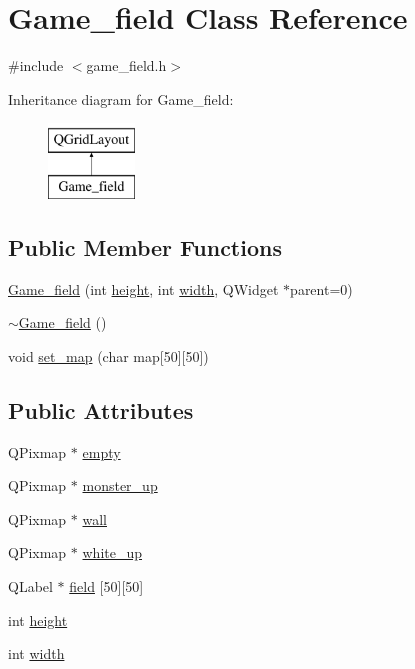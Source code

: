 \hypertarget{classGame__field}{\section{Game\-\_\-field Class Reference}
\label{classGame__field}
}


{\ttfamily \#include $<$game\-\_\-field.\-h$>$}

Inheritance diagram for Game\-\_\-field\-:\begin{figure}[H]
\begin{center}
\leavevmode
\includegraphics[height=2.000000cm]{classGame__field}
\end{center}
\end{figure}
\subsection*{Public Member Functions}
\begin{DoxyCompactItemize}
\item 
\hyperlink{classGame__field_ae0ab9fc16c3480706396bc866eacda71}{Game\-\_\-field} (int \hyperlink{classGame__field_a21f6f197950dc49b669faa6d90208912}{height}, int \hyperlink{classGame__field_aded6e31a0afaf905171e2a4b06a52e29}{width}, Q\-Widget $\ast$parent=0)
\item 
\hyperlink{classGame__field_a5372177f62cdd385680813be54d5e80f}{$\sim$\-Game\-\_\-field} ()
\item 
void \hyperlink{classGame__field_a9af443542dd34f1d13e08d9358a06a33}{set\-\_\-map} (char map\mbox{[}50\mbox{]}\mbox{[}50\mbox{]})
\end{DoxyCompactItemize}
\subsection*{Public Attributes}
\begin{DoxyCompactItemize}
\item 
Q\-Pixmap $\ast$ \hyperlink{classGame__field_ae9235aa8798fdb0db4385064b5c40b21}{empty}
\item 
Q\-Pixmap $\ast$ \hyperlink{classGame__field_aef92a0fbf4509d6b6bfa9f8833acdbb9}{monster\-\_\-up}
\item 
Q\-Pixmap $\ast$ \hyperlink{classGame__field_a7366baff6372c613d42616d7e0286fa0}{wall}
\item 
Q\-Pixmap $\ast$ \hyperlink{classGame__field_af81b72dc5a1da7aae4929bdd43c449bd}{white\-\_\-up}
\item 
Q\-Label $\ast$ \hyperlink{classGame__field_a144d007ae7c2224829dd34d67dd96e98}{field} \mbox{[}50\mbox{]}\mbox{[}50\mbox{]}
\item 
int \hyperlink{classGame__field_a21f6f197950dc49b669faa6d90208912}{height}
\item 
int \hyperlink{classGame__field_aded6e31a0afaf905171e2a4b06a52e29}{width}
\end{DoxyCompactItemize}


